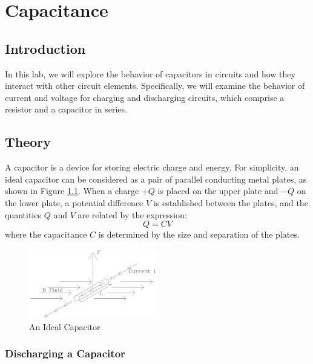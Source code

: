 \chapter{Capacitance}

\section{Introduction}

In this lab, we will explore the behavior of capacitors in circuits and how they interact with other circuit elements. Specifically, we will examine the behavior of current and voltage for charging and discharging  circuits, which comprise a resistor and a capacitor in series.

\section{Theory}

A capacitor is a device for storing electric charge and energy. For simplicity, an ideal capacitor can be considered as a pair of parallel conducting metal plates, as shown in Figure \ref{fig:capacitor}. When a charge $+Q$ is placed on the upper plate and $-Q$ on the lower plate, a potential difference $V$ is established between the plates, and the quantities $Q$ and $V$ are related by the expression:
\begin{equation}
    Q = CV
\end{equation}
where the capacitance $C$ is determined by the size and separation of the plates.

\begin{figure}[h]
    \begin{center}
        \includegraphics[width=0.5\textwidth]{./Exp4/pic/image1.png}
    \end{center}
    \caption{An Ideal Capacitor}
    \label{fig:capacitor}
\end{figure}

\subsection{Discharging a Capacitor}

